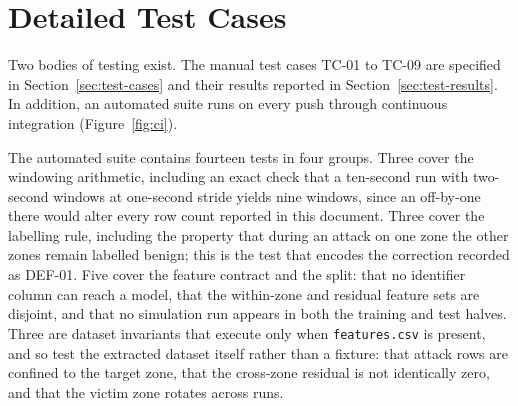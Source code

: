 \chapter{Detailed Test Cases}
Two bodies of testing exist. The manual test cases TC-01 to TC-09 are specified in
Section~\ref{sec:test-cases} and their results reported in Section~\ref{sec:test-results}. In addition, an automated
suite runs on every push through continuous integration (Figure~\ref{fig:ci}).

The automated suite contains fourteen tests in four groups. Three cover the
windowing arithmetic, including an exact check that a ten-second run with
two-second windows at one-second stride yields nine windows, since an off-by-one
there would alter every row count reported in this document. Three cover the
labelling rule, including the property that during an attack on one zone the other
zones remain labelled benign; this is the test that encodes the correction recorded
as DEF-01. Five cover the feature contract and the split: that no identifier column
can reach a model, that the within-zone and residual feature sets are disjoint, and
that no simulation run appears in both the training and test halves. Three are
dataset invariants that execute only when \texttt{features.csv} is present, and so
test the extracted dataset itself rather than a fixture: that attack rows are
confined to the target zone, that the cross-zone residual is not identically zero,
and that the victim zone rotates across runs.

